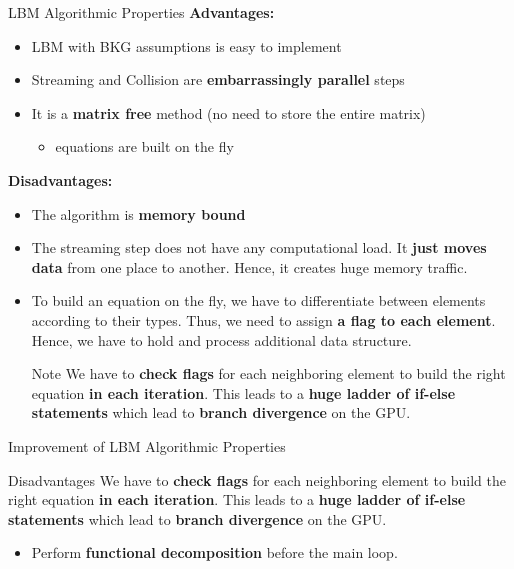 \documentclass[9pt]{beamer}
\newcommand{\emphasize}[1]{\textbf{\color{red} #1 } }
\begin{document}
\begin{frame}[t]{LBM Algorithmic Properties}
\emphasize{Advantages:}
\begin{itemize}
\item LBM with BKG assumptions is easy to implement
\item Streaming and Collision are \textbf{embarrassingly parallel} steps
\item It is a \textbf{matrix free} method (no need to store the entire matrix)
\begin{itemize}
	\item equations are built on the fly
\end{itemize}

\end{itemize}
\emphasize{Disadvantages:}
\begin{itemize}
\item The algorithm is \textbf{memory bound}
\item The streaming step does not have any computational load. It \textbf{just moves data} from one place to another. Hence, it creates huge memory traffic.
\item To build an equation on the fly, we have to differentiate between elements according to their types. Thus, we need to assign \textbf{a flag to each element}. Hence, we have to hold and process additional data structure.
\begin{alertblock}{Note}
We have to \textbf{check flags} for each neighboring element to build the right equation \textbf{in each iteration}. This leads to a \textbf{huge ladder of if-else statements} which lead to \textbf{branch divergence} on the GPU.
\end{alertblock}

\end{itemize}
\end{frame}


\begin{frame}[t]{Improvement of LBM Algorithmic Properties}
\begin{block}{Disadvantages}
We have to \textbf{check flags} for each neighboring element to build the right equation \textbf{in each iteration}. This leads to a \textbf{huge ladder of if-else statements} which lead to \textbf{branch divergence} on the GPU.
\end{block}
\begin{itemize}
\item Perform \textbf{functional decomposition} before the main loop.
\end{itemize}
\end{frame}
\end{document}
